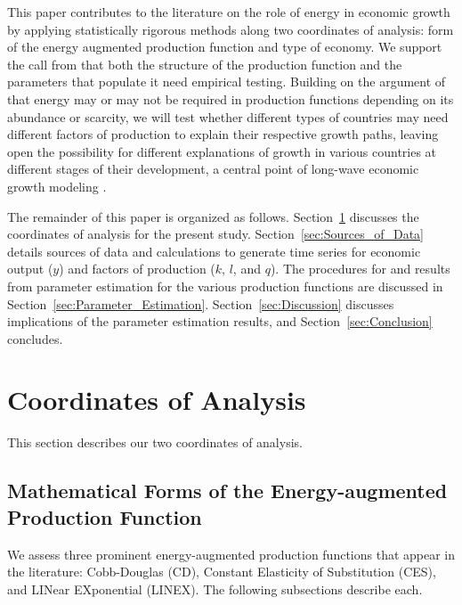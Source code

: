 \documentclass[preprint,authoryear,12pt]{elsarticle}\usepackage[]{graphicx}\usepackage[]{color}
\begin{document}
This paper contributes to the literature on the role of energy in economic growth
by applying statistically rigorous 
methods along two coordinates of analysis: 
form of the energy augmented production function 
and type of economy.
We support the call from \citet{Shen:2013vp} that both
the structure of the production function 
and the parameters that populate it 
need empirical testing. 
Building on the argument of \citet{Stern:2011bq} 
that energy may or may not be required in production functions 
depending on its abundance or scarcity, 
we will test whether different types of countries 
may need different factors of production to explain their respective growth paths, 
leaving open the possibility for 
different explanations of growth in various countries
at different stages of their development, 
a central point of long-wave economic growth modeling \citep{Froling:2009vo, Jones:2001wn, Galor:2000up}.

The remainder of this paper is organized as follows. 
Section~\ref{sec:Coordinates} discusses the coordinates of analysis for the present study. 
Section~\ref{sec:Sources_of_Data} details sources of data and calculations to 
generate time series for economic output ($y$) and factors of production ($k$, $l$, and $q$). 
The procedures for and results from parameter estimation for the various production functions 
are discussed in Section~\ref{sec:Parameter_Estimation}. 
Section~\ref{sec:Discussion} discusses implications of the parameter estimation 
results, and Section~\ref{sec:Conclusion} concludes.


\section{Coordinates of Analysis} 
\label{sec:Coordinates}

This section describes our two coordinates of analysis.


\subsection{Mathematical Forms of the Energy-augmented Production Function} 
\label{sec:Prod_Func_Forms}

We assess three prominent energy-augmented production functions 
that appear in the literature: 
Cobb-Douglas (CD), 
Constant Elasticity of Substitution (CES), and 
LINear EXponential (LINEX). 
The following subsections describe each.
\end{document}
